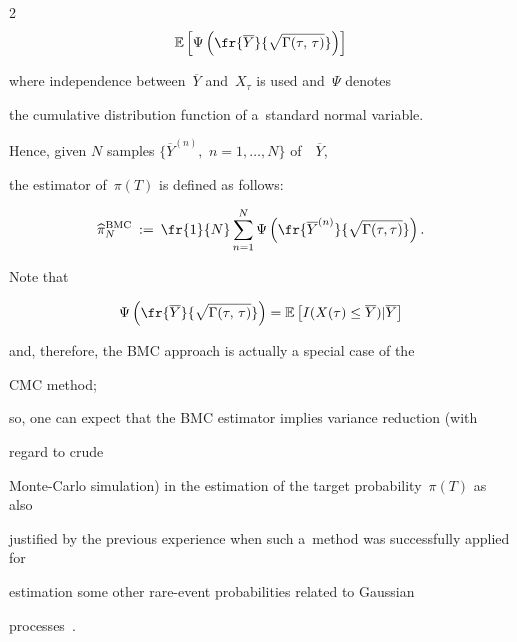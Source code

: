 \begin{multicols}{2}
\begin{equation*}
\mathbb{E}\left[\Psi\left(\fr{\overline{Y}}{ \sqrt{\Gamma(\tau,\,\tau)}}\right)\right]

\end{equation*}

where independence between~$\overline{Y}$ and~$X_{\tau}$ is used and~$\Psi$ denotes 

the cumulative distribution function of a~standard normal variable.



Hence, given $N$ samples $\{\overline{Y}^{(n)},\,\,n=1,\ldots,N\}$  of~~$\overline{Y}$,

the estimator of~$\pi(T)$ is defined as follows:

\begin{equation*}

\widehat{\pi}_N^{\mathrm{BMC}} \: := \: \fr{1}{N}\sum\limits_{n=1}^N

\Psi

\left(\fr{\overline{Y}^{(n)}}{\sqrt{\Gamma(\tau,\tau)}}\right).


\end{equation*}





Note that

\begin{equation*}

\Psi\left(\fr{\overline{Y}}{ \sqrt{\Gamma(\tau,\,\tau)}}\right)=

\mathbb{E} \left[ I(X(\tau) \le \overline{Y}) | \overline{Y}\right]


\end{equation*}

and, therefore, the BMC approach is actually a special case of the  

CMC method;

so, one can expect that the BMC estimator implies variance reduction  (with

regard to crude 

Monte-Carlo simulation) in   the estimation of the target probability~$\pi(T)$ as also 

justified by the previous experience when such a~method was successfully applied for 

estimation some other rare-event probabilities related to Gaussian 

processes~\cite{23-luk-1}.  






\end{multicols}
